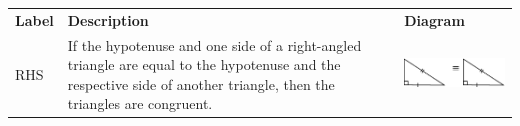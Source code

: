         \begin{center}
      \label{m39368*id317997}
    \noindent
      \tablelasttail{}
      \begin{xtabular*}{\mytablewidth}[t]{|p{10\mystarwidth}|p{10\mystarwidth}|p{10\mystarwidth}|}\hline
                    \textbf{Label}
                   &
                    \textbf{Description}
                   &
                    \textbf{Diagram}
     \tabularnewline{}
        RHS &
        If the hypotenuse and one side of a right-angled triangle are equal to the hypotenuse and the respective side of another triangle, then the triangles are congruent. &
    \setcounter{subfigure}{0}
\label{m39368*id318071}
    \begin{center}
    \label{m39368*id318071!!!underscore!!!media}\label{m39368*id318071!!!underscore!!!printimage}\includegraphics{col11306.imgs/m39368_MG10C13_031.png} %
      \vspace{2pt}

\end{center}
\end{xtabular*}
\end{center}
